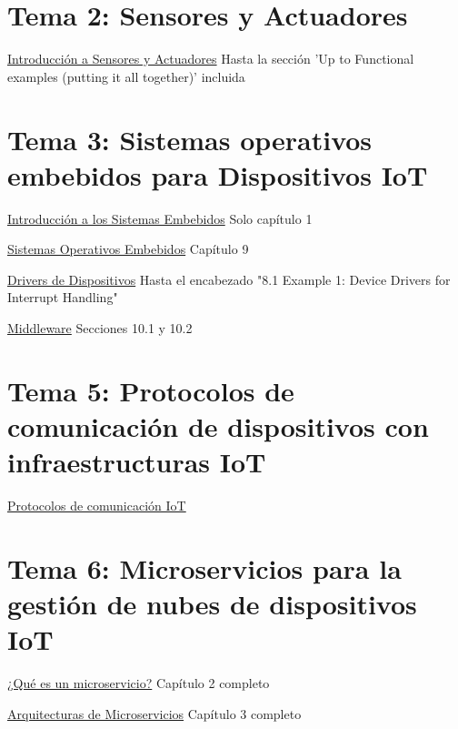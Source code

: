 \documentclass[12pt, twoside, openright]{report} %
\begin{document}
\section{Tema 2: Sensores y Actuadores}
\href{https://learning.oreilly.com/library/view/internet-of-things/9781788470599/d39be056-b166-476e-868e-c415e4dfa886.xhtml}{Introducción a Sensores y Actuadores} Hasta la sección 'Up to Functional examples (putting it all together)' incluida

\section{Tema 3: Sistemas operativos embebidos para Dispositivos IoT}
\href{https://learning.oreilly.com/library/view/embedded-systems-architecture/9780123821966/xhtml/CHP001.html#CHP001titl}{Introducción a los Sistemas Embebidos} Solo capítulo 1

\href{https://learning.oreilly.com/library/view/embedded-systems-architecture/9780123821966/xhtml/CHP009.html#CHP009titl}{Sistemas Operativos Embebidos} Capítulo 9

\href{https://learning.oreilly.com/library/view/embedded-systems-architecture/9780123821966/xhtml/CHP008.html#CHP008titl}{Drivers de Dispositivos} Hasta el encabezado "8.1 Example 1: Device Drivers for Interrupt Handling"

\href{https://learning.oreilly.com/library/view/embedded-systems-architecture/9780123821966/xhtml/CHP010.html#CHP010titl}{Middleware} Secciones 10.1 y 10.2

\section{Tema 5: Protocolos de comunicación de dispositivos con infraestructuras IoT}
\href{https://learning.oreilly.com/library/view/internet-of-things/9781788470599/b34f5cd8-115c-490c-b5c2-38a3a966a65a.xhtml}{Protocolos de comunicación IoT}

\section{Tema 6: Microservicios para la gestión de nubes de dispositivos IoT}
\href{https://learning.oreilly.com/library/view/microservices-iot-and/9781484212752/9781484212769_Ch02.xhtml}{¿Qué es un microservicio?} Capítulo 2 completo

\href{https://learning.oreilly.com/library/view/microservices-iot-and/9781484212752/9781484212769_Ch03.xhtml}{Arquitecturas de Microservicios} Capítulo 3 completo
\end{document}
